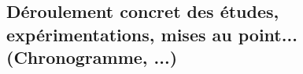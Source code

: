 \documentclass[a4paper, 11pt, french]{report}
\begin{document}
                                                                                                                                                                                                                                                                    \subsection{Déroulement
                                                                                                                                                                                                                                                                    concret
                                                                                                                                                                                                                                                                    des
                                                                                                                                                                                                                                                                    études,
                                                                                                                                                                                                                                                                    expérimentations,
                                                                                                                                                                                                                                                                    mises
                                                                                                                                                                                                                                                                    au
                                                                                                                                                                                                                                                                    point...
                                                                                                                                                                                                                                                                    (Chronogramme,
                                                                                                                                                                                                                                                                    ...)}
\end{document}
